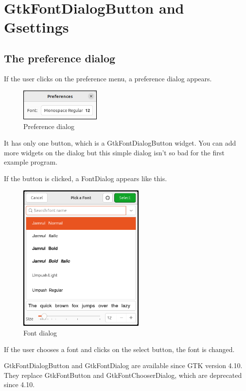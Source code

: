 \section{GtkFontDialogButton and
Gsettings}\label{gtkfontdialogbutton-and-gsettings}

\subsection{The preference dialog}\label{the-preference-dialog}

If the user clicks on the preference menu, a preference dialog appears.

\begin{figure}
\centering
\includegraphics[width=4cm,height=1.6cm]{../image/pref_dialog.png}
\caption{Preference dialog}
\end{figure}

It has only one button, which is a GtkFontDialogButton widget. You can
add more widgets on the dialog but this simple dialog isn't so bad for
the first example program.

If the button is clicked, a FontDialog appears like this.

\begin{figure}
\centering
\includegraphics[width=6.27cm,height=7.38cm]{../image/fontdialog.png}
\caption{Font dialog}
\end{figure}

If the user chooses a font and clicks on the select button, the font is
changed.

GtkFontDialogButton and GtkFontDialog are available since GTK version
4.10. They replace GtkFontButton and GtkFontChooserDialog, which are
deprecated since 4.10.


